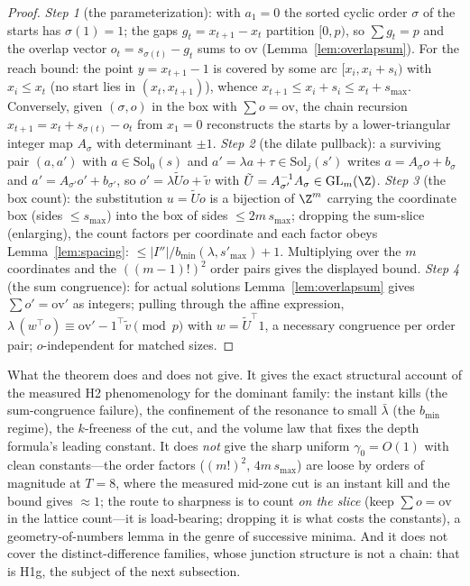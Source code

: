 \begin{proof}
\emph{Step 1} (the parameterization): with $a_1=0$ the sorted cyclic
order $\sigma$ of the starts has $\sigma(1)=1$; the gaps
$g_t=x_{t+1}-x_t$ partition $[0,p)$, so $\sum g_t=p$ and the overlap
vector $o_t=s_{\sigma(t)}-g_t$ sums to $\mathrm{ov}$
(Lemma~\ref{lem:overlapsum}). For the reach bound: the point
$y=x_{t+1}-1$ is covered by some arc $[x_i,x_i+s_i)$ with
$x_i\le x_t$ (no start lies in $(x_t,x_{t+1})$), whence
$x_{t+1}\le x_i+s_i\le x_t+s_{\max}$. Conversely, given $(\sigma,o)$ in
the box with $\sum o=\mathrm{ov}$, the chain recursion
$x_{t+1}=x_t+s_{\sigma(t)}-o_t$ from $x_1=0$ reconstructs the starts
by a lower-triangular integer map $A_\sigma$ with determinant $\pm1$.
\emph{Step 2} (the dilate pullback): a surviving pair
$(a,a')$ with $a\in\mathrm{Sol}_0(s)$ and
$a'=\lambda a+\tau\in\mathrm{Sol}_j(s')$ writes
$a=A_\sigma o+b_\sigma$ and $a'=A_{\sigma'}o'+b_{\sigma'}$, so
$o'=\lambda\tilde U o+\tilde v$ with $\tilde U=A_{\sigma'}^{-1}A_\sigma
\in\mathrm{GL}_m(\Z)$.
\emph{Step 3} (the box count): the substitution $u=\tilde Uo$ is a
bijection of $\Z^m$ carrying the coordinate box (sides $\le s_{\max}$)
into the box of sides $\le 2m\,s_{\max}$; dropping the sum-slice
(enlarging), the count factors per coordinate and each factor obeys
Lemma~\ref{lem:spacing}: $\le|I''|/b_{\min}(\lambda,s'_{\max})+1$.
Multiplying over the $m$ coordinates and the $((m-1)!)^2$ order pairs
gives the displayed bound.
\emph{Step 4} (the sum congruence): for actual solutions
Lemma~\ref{lem:overlapsum} gives $\sum o'=\mathrm{ov}'$ as integers;
pulling through the affine expression,
$\lambda\,(w^\top o)\equiv\mathrm{ov}'-1^\top\tilde v\pmod p$ with
$w=\tilde U^\top 1$, a necessary congruence per order pair;
$o$-independent for matched sizes.
\end{proof}

What the theorem does and does not give. It gives the exact structural
account of the measured H2 phenomenology for the dominant family: the
instant kills (the sum-congruence failure), the confinement of the
resonance to small $\bar\lambda$ (the $b_{\min}$ regime), the
$k$-freeness of the cut, and the volume law that fixes the depth
formula's leading constant. It does \emph{not} give the sharp uniform
$\gamma_0=O(1)$ with clean constants---the order factors
($(m!)^2$, $4m\,s_{\max}$) are loose by orders of magnitude at $T=8$,
where the measured mid-zone cut is an instant kill and the bound gives
$\approx1$; the route to sharpness is to count \emph{on the slice}
(keep $\sum o=\mathrm{ov}$ in the lattice count---it is load-bearing;
dropping it is what costs the constants), a geometry-of-numbers lemma
in the genre of successive minima. And it does not cover the
distinct-difference families, whose junction structure is not a chain:
that is H1g, the subject of the next subsection.

